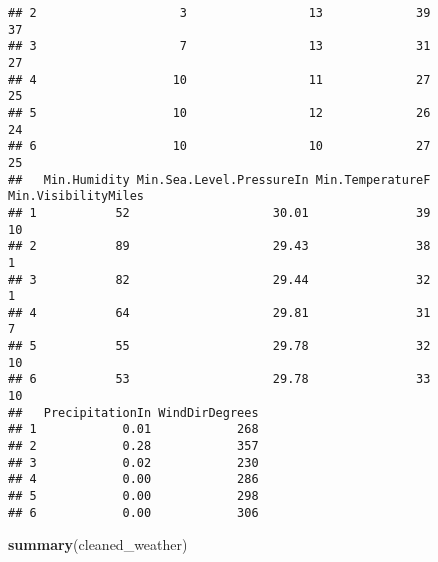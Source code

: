 \documentclass[
]{article}
\newenvironment{Shaded}{\begin{snugshade}}{\end{snugshade}}
\newcommand{\KeywordTok}[1]{\textcolor[rgb]{0.13,0.29,0.53}{\textbf{#1}}}
\newcommand{\NormalTok}[1]{#1}
\begin{document}
\begin{verbatim}
## 2                    3                 13             39            37
## 3                    7                 13             31            27
## 4                   10                 11             27            25
## 5                   10                 12             26            24
## 6                   10                 10             27            25
##   Min.Humidity Min.Sea.Level.PressureIn Min.TemperatureF Min.VisibilityMiles
## 1           52                    30.01               39                  10
## 2           89                    29.43               38                   1
## 3           82                    29.44               32                   1
## 4           64                    29.81               31                   7
## 5           55                    29.78               32                  10
## 6           53                    29.78               33                  10
##   PrecipitationIn WindDirDegrees
## 1            0.01            268
## 2            0.28            357
## 3            0.02            230
## 4            0.00            286
## 5            0.00            298
## 6            0.00            306
\end{verbatim}

\begin{Shaded}
\begin{Highlighting}[]
\KeywordTok{summary}\NormalTok{(cleaned_weather)}
\end{Highlighting}
\end{Shaded}
\end{document}
